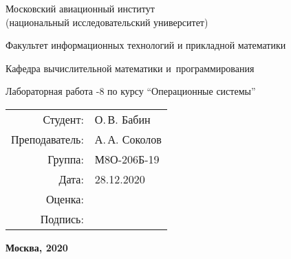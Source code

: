 \begin{titlepage}
\begin{center}
\bfseries

{\Large Московский авиационный институт\\ (национальный исследовательский университет)}

\vspace{48pt}

{\large Факультет информационных технологий и прикладной математики
}

{\large Кафедра вычислительной математики и~программирования}


\vspace{48pt}

Лабораторная работа -8 по курсу \enquote{Операционные системы}

\vspace{24pt}

\end{center}

\vspace{72pt}

\begin{flushright}
\begin{tabular}{rl}
Студент: & О.\,В. Бабин \\
Преподаватель: & А.\,А. Соколов  \\
Группа: & М8О-206Б-19 \\
Дата: & 28.12.2020 \\
Оценка: & \\
Подпись: & \\
\end{tabular}
\end{flushright}

\vfill

\begin{center}
\bfseries
Москва, 2020
\end{center}
\end{titlepage}

\pagebreak
